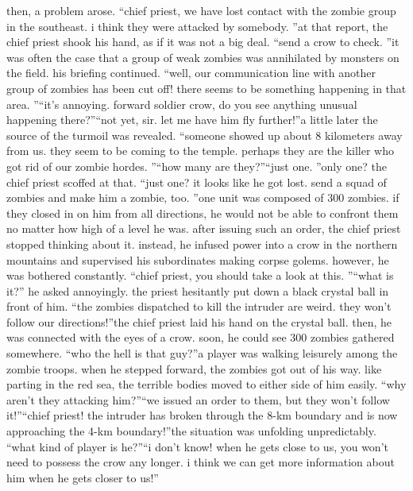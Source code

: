 then, a problem arose.
“chief priest, we have lost contact with the zombie group in the southeast.
 i think they were attacked by somebody.
”at that report, the chief priest shook his hand, as if it was not a big deal.
“send a crow to check.
”it was often the case that a group of weak zombies was annihilated by monsters on the field.
 his briefing continued.
“well, our communication line with another group of zombies has been cut off! there seems to be something happening in that area.
”“it’s annoying.
 forward soldier crow, do you see anything unusual happening there?”“not yet, sir.
 let me have him fly further!”a little later the source of the turmoil was revealed.
“someone showed up about 8 kilometers away from us.
 they seem to be coming to the temple.
 perhaps they are the killer who got rid of our zombie hordes.
”“how many are they?”“just one.
”only one? the chief priest scoffed at that.
“just one? it looks like he got lost.
 send a squad of zombies and make him a zombie, too.
”one unit was composed of 300 zombies.
 if they closed in on him from all directions, he would not be able to confront them no matter how high of a level he was.
after issuing such an order, the chief priest stopped thinking about it.
 instead, he infused power into a crow in the northern mountains and supervised his subordinates making corpse golems.
however, he was bothered constantly.
“chief priest, you should take a look at this.
”“what is it?” he asked annoyingly.
the priest hesitantly put down a black crystal ball in front of him.
“the zombies dispatched to kill the intruder are weird.
 they won’t follow our directions!”the chief priest laid his hand on the crystal ball.
 then, he was connected with the eyes of a crow.
soon, he could see 300 zombies gathered somewhere.
“who the hell is that guy?”a player was walking leisurely among the zombie troops.
 when he stepped forward, the zombies got out of his way.
like parting in the red sea, the terrible bodies moved to either side of him easily.
“why aren’t they attacking him?”“we issued an order to them, but they won’t follow it!”“chief priest! the intruder has broken through the 8-km boundary and is now approaching the 4-km boundary!”the situation was unfolding unpredictably.
“what kind of player is he?”“i don’t know! when he gets close to us, you won’t need to possess the crow any longer.
 i think we can get more information about him when he gets closer to us!”

